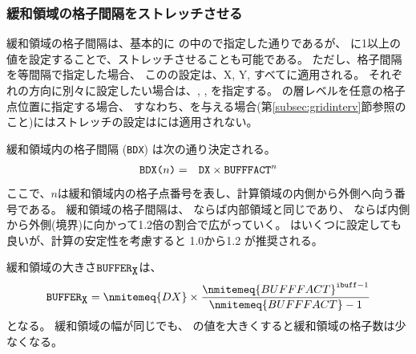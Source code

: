 \subsubsection{緩和領域の格子間隔をストレッチさせる}

緩和領域の格子間隔は、基本的に
の中ので指定した通りであるが、
に1以上の値を設定することで、ストレッチさせることも可能である。
ただし、格子間隔を等間隔で指定した場合、
このの設定は、X, Y, {\ZDIR}すべてに適用される。
それぞれの方向に別々に設定したい場合は、, , を指定する。
{\ZDIR}の層レベルを任意の格子点位置に指定する場合、
すなわち、を与える場合(第\ref{subsec:gridinterv}節参照のこと)にはストレッチの設定は{\ZDIR}には適用されない。

緩和領域内の格子間隔 (\verb|BDX|) は次の通り決定される。
\begin{eqnarray}
 \verb|BDX(|n\verb|)| &=& \verb|DX| \times \verb|BUFFFACT|^n \nonumber
\end{eqnarray}
ここで、$n$は緩和領域内の格子点番号を表し、計算領域の内側から外側へ向う番号である。
緩和領域の格子間隔は、
ならば内部領域と同じであり、
ならば内側から外側(境界)に向かって1.2倍の割合で広がっていく。
はいくつに設定しても良いが、計算の安定性を考慮すると 1.0から1.2 が推奨される。


緩和領域の大きさ$\verb|BUFFER|_{\verb|X|}$は、
\[
  \verb|BUFFER|_{\verb|X|} = \nmitemeq{DX} \times \frac{ \nmitemeq{BUFFFACT}^{\texttt{\detokenize{ibuff}}-1 }}{ \nmitemeq{BUFFFACT}-1 }
\]
となる。
%
緩和領域の幅が同じでも、
の値を大きくすると緩和領域の格子数は少なくなる。

